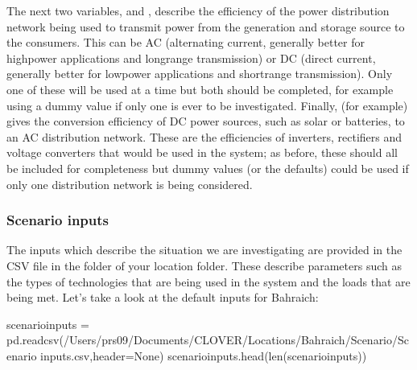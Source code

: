 \documentclass[letterpaper,10pt,english]{sphinxmanual}
\begin{document}
\sphinxAtStartPar
The next two variables,  and
, describe the efficiency of the power
distribution network being used to transmit power from the generation
and storage source to the consumers. This can be AC (alternating
current, generally better for high\sphinxhyphen{}power applications and long\sphinxhyphen{}range
transmission) or DC (direct current, generally better for low\sphinxhyphen{}power
applications and short\sphinxhyphen{}range transmission). Only one of these will be
used at a time but both should be completed, for example using a dummy
value if only one is ever to be investigated. Finally,
 (for example) gives the conversion efficiency of
DC power sources, such as solar or batteries, to an AC distribution
network. These are the efficiencies of inverters, rectifiers and voltage
converters that would be used in the system; as before, these should all
be included for completeness but dummy values (or the defaults) could be
used if only one distribution network is being considered.

\sphinxAtStartPar
{}  


\subsubsection{Scenario inputs}
\label{\detokenize{energy_system_simulation:scenario-inputs}}
\sphinxAtStartPar
The inputs which describe the situation we are investigating are
provided in the  CSV file in the  folder of
your location folder. These describe parameters such as the types of
technologies that are being used in the system and the loads that are
being met. Let’s take a look at the default inputs for Bahraich:

\begin{sphinxVerbatim}[commandchars=\\\{\}]
scenario\PYGZus{}inputs = pd.read\PYGZus{}csv(\PYGZdq{}/Users/prs09/Documents/CLOVER/Locations/Bahraich/Scenario/Scenario inputs.csv\PYGZdq{},header=None)
scenario\PYGZus{}inputs.head(len(scenario\PYGZus{}inputs))
\end{sphinxVerbatim}
\end{document}
